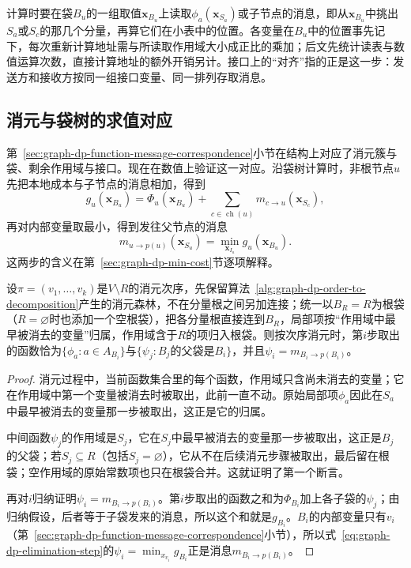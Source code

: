 计算时要在袋$B_u$的一组取值$\bm x_{B_u}$上读取$\phi_a(\bm x_{S_a})$或子节点的消息，即从$\bm x_{B_u}$中挑出$S_a$或$S_c$的那几个分量，再算它们在小表中的位置。各变量在$B_u$中的位置事先记下，每次重新计算地址需与所读取作用域大小成正比的乘加；后文先统计读表与数值运算次数，直接计算地址的额外开销另计。接口上的“对齐”指的正是这一步：发送方和接收方按同一组接口变量、同一排列存取消息。

\subsection{消元与袋树的求值对应}
\label{sec:graph-dp-elimination-message-correspondence}

第~\ref{sec:graph-dp-function-message-correspondence}小节在结构上对应了消元簇与袋、剩余作用域与接口。现在在数值上验证这一对应。沿袋树计算时，非根节点$u$先把本地成本与子节点的消息相加，得到
\[
g_u(\bm x_{B_u})=\Phi_u(\bm x_{B_u})+\sum_{c\in\operatorname{ch}(u)}m_{c\to u}(\bm x_{S_c}),
\]
再对内部变量取最小，得到发往父节点的消息
\[
m_{u\to p(u)}(\bm x_{S_u})=\min_{\bm x_{I_u}}g_u(\bm x_{B_u}).
\]
这两步的含义在第~\ref{sec:graph-dp-min-cost}节逐项解释。

\begin{theorem}[消元中间函数等于袋消息]
\label{thm:graph-dp-elimination-equals-messages}
设$\pi=(v_1,\ldots,v_k)$是$V\setminus R$的消元次序，先保留算法~\ref{alg:graph-dp-order-to-decomposition}产生的消元森林，不在分量根之间另加连接；统一以$B_R=R$为根袋（$R=\varnothing$时也添加一个空根袋），把各分量根直接连到$B_R$，局部项按“作用域中最早被消去的变量”归属，作用域含于$R$的项归入根袋。则按次序消元时，第$i$步取出的函数恰为$\{\phi_a:a\in A_{B_i}\}$与$\{\psi_j:B_j\text{的父袋是}B_i\}$，并且$\psi_i=m_{B_i\to p(B_i)}$。
\end{theorem}

\begin{proof}
消元过程中，当前函数集合里的每个函数，作用域只含尚未消去的变量；它在作用域中第一个变量被消去时被取出，此前一直不动。原始局部项$\phi_a$因此在$S_a$中最早被消去的变量那一步被取出，这正是它的归属。

中间函数$\psi_j$的作用域是$S_j$，它在$S_j$中最早被消去的变量那一步被取出，这正是$B_j$的父袋；若$S_j\subseteq R$（包括$S_j=\varnothing$），它从不在后续消元步骤被取出，最后留在根袋；空作用域的原始常数项也只在根袋合并。这就证明了第一个断言。

再对$i$归纳证明$\psi_i=m_{B_i\to p(B_i)}$。第$i$步取出的函数之和为$\Phi_{B_i}$加上各子袋的$\psi_j$；由归纳假设，后者等于子袋发来的消息，所以这个和就是$g_{B_i}$。$B_i$的内部变量只有$v_i$（第~\ref{sec:graph-dp-function-message-correspondence}小节），所以式~\eqref{eq:graph-dp-elimination-step}的$\psi_i=\min_{x_{v_i}}g_{B_i}$正是消息$m_{B_i\to p(B_i)}$。
\end{proof}

